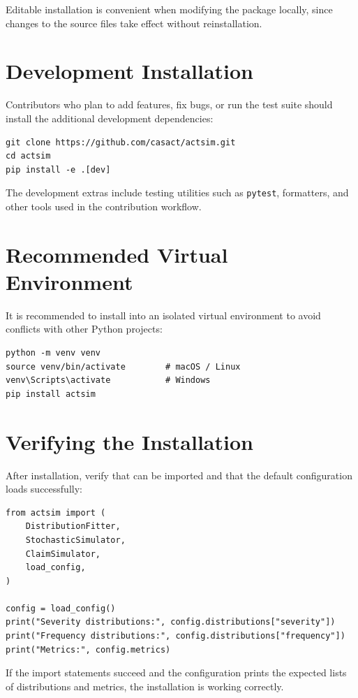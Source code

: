 Editable installation is convenient when modifying the package locally,
since changes to the source files take effect without reinstallation.

\section{Development Installation}

Contributors who plan to add features, fix bugs, or run the test suite
should install the additional development dependencies:

\begin{lstlisting}[style=bashstyle]
git clone https://github.com/casact/actsim.git
cd actsim
pip install -e .[dev]
\end{lstlisting}

The development extras include testing utilities such as \texttt{pytest},
formatters, and other tools used in the contribution workflow.

\section{Recommended Virtual Environment}

It is recommended to install \actsim into an isolated virtual environment
to avoid conflicts with other Python projects:

\begin{lstlisting}[style=bashstyle]
python -m venv venv
source venv/bin/activate        # macOS / Linux
venv\Scripts\activate           # Windows
pip install actsim
\end{lstlisting}

\section{Verifying the Installation}

After installation, verify that \actsim can be imported and that the
default configuration loads successfully:

\begin{lstlisting}[style=pythonstyle]
from actsim import (
    DistributionFitter,
    StochasticSimulator,
    ClaimSimulator,
    load_config,
)

config = load_config()
print("Severity distributions:", config.distributions["severity"])
print("Frequency distributions:", config.distributions["frequency"])
print("Metrics:", config.metrics)
\end{lstlisting}

If the import statements succeed and the configuration prints the expected
lists of distributions and metrics, the installation is working correctly.
